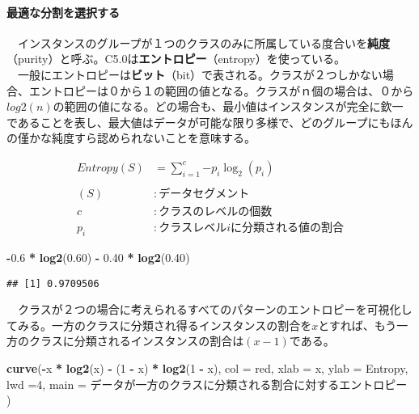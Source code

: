 \documentclass[
]{article}
\newenvironment{Shaded}{\begin{snugshade}}{\end{snugshade}}
\newcommand{\AttributeTok}[1]{\textcolor[rgb]{0.13,0.29,0.53}{#1}}
\newcommand{\DecValTok}[1]{\textcolor[rgb]{0.00,0.00,0.81}{#1}}
\newcommand{\FloatTok}[1]{\textcolor[rgb]{0.00,0.00,0.81}{#1}}
\newcommand{\FunctionTok}[1]{\textcolor[rgb]{0.13,0.29,0.53}{\textbf{#1}}}
\newcommand{\NormalTok}[1]{#1}
\newcommand{\SpecialCharTok}[1]{\textcolor[rgb]{0.81,0.36,0.00}{\textbf{#1}}}
\newcommand{\StringTok}[1]{\textcolor[rgb]{0.31,0.60,0.02}{#1}}
\begin{document}
\paragraph{最適な分割を選択する}\label{ux6700ux9069ux306aux5206ux5272ux3092ux9078ux629eux3059ux308b}

　インスタンスのグループが１つのクラスのみに所属している度合いを\textbf{純度}（purity）と呼ぶ。C5.0は\textbf{エントロピー}（entropy）を使っている。\\
　一般にエントロピーは\textbf{ビット}（bit）で表される。クラスが２つしかない場合、エントロピーは０から１の範囲の値となる。クラスがｎ個の場合は、０から\(log2(n)\)の範囲の値になる。どの場合も、最小値はインスタンスが完全に欽一であることを表し、最大値はデータが可能な限り多様で、どのグループにもほんの僅かな純度すら認められないことを意味する。

\[
\begin{aligned} 
Entropy(S) &= \sum_{i=1}^{c}{-p_i\log_2{(p_i)}}\\
\\
(S) &: データセグメント\\
c &: クラスのレベルの個数\\
p_i &: クラスレベルiに分類される値の割合
\end{aligned}
\]

\begin{Shaded}
\begin{Highlighting}[]
\SpecialCharTok{{-}}\FloatTok{0.6} \SpecialCharTok{*} \FunctionTok{log2}\NormalTok{(}\FloatTok{0.60}\NormalTok{) }\SpecialCharTok{{-}} \FloatTok{0.40} \SpecialCharTok{*} \FunctionTok{log2}\NormalTok{(}\FloatTok{0.40}\NormalTok{)}
\end{Highlighting}
\end{Shaded}

\begin{verbatim}
## [1] 0.9709506
\end{verbatim}

　クラスが２つの場合に考えられるすべてのパターンのエントロピーを可視化してみる。一方のクラスに分類され得るインスタンスの割合を\(x\)とすれば、もう一方のクラスに分類されるインスタンスの割合は\((x-1)\)である。

\begin{Shaded}
\begin{Highlighting}[]
\FunctionTok{curve}\NormalTok{(}\SpecialCharTok{{-}}\NormalTok{x }\SpecialCharTok{*} \FunctionTok{log2}\NormalTok{(x) }\SpecialCharTok{{-}}\NormalTok{ (}\DecValTok{1} \SpecialCharTok{{-}}\NormalTok{ x) }\SpecialCharTok{*} \FunctionTok{log2}\NormalTok{(}\DecValTok{1} \SpecialCharTok{{-}}\NormalTok{ x), }
      \AttributeTok{col =} \StringTok{\textquotesingle{}red\textquotesingle{}}\NormalTok{, }
      \AttributeTok{xlab =} \StringTok{\textquotesingle{}x\textquotesingle{}}\NormalTok{, }
      \AttributeTok{ylab =} \StringTok{\textquotesingle{}Entropy\textquotesingle{}}\NormalTok{, }
      \AttributeTok{lwd =}\DecValTok{4}\NormalTok{,}
      \AttributeTok{main =} \StringTok{\textquotesingle{}データが一方のクラスに分類される割合に対するエントロピー\textquotesingle{}}
\NormalTok{      )}
\end{Highlighting}
\end{Shaded}
\end{document}
